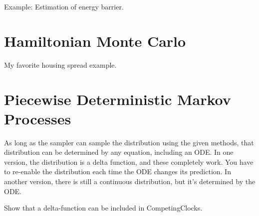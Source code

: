 \documentclass{article}
\begin{document}
Example: Estimation of energy barrier.


\section{Hamiltonian Monte Carlo}

My favorite housing spread example.


\section{Piecewise Deterministic Markov Processes}

As long as the sampler can sample the distribution using the given methods, that distribution can be determined by any equation, including an ODE. In one version, the distribution is a delta function, and these completely work. You have to re-enable the distribution each time the ODE changes its prediction. In another version, there is still a continuous distribution, but it's determined by the ODE.

Show that a delta-function can be included in CompetingClocks.
\end{document}
